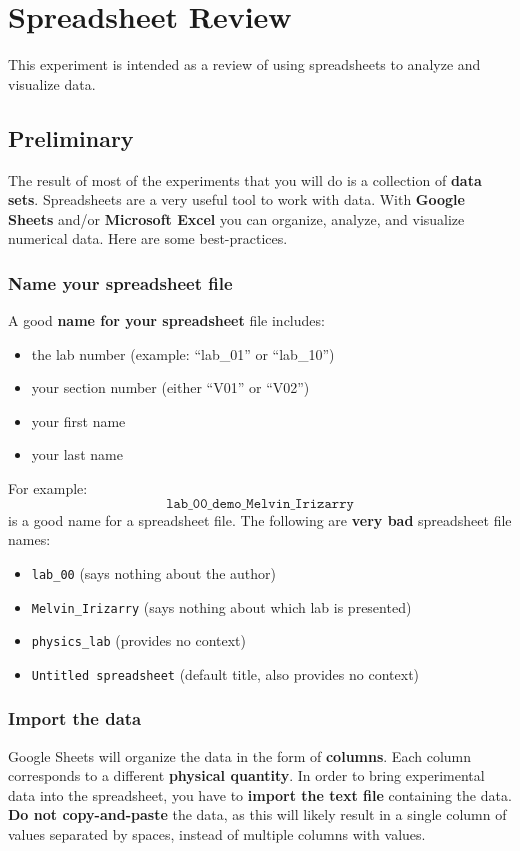 \setcounter{chapter}{-1}
\chapter{Spreadsheet Review}
%
This experiment is intended as a review of using spreadsheets to analyze and visualize data.
%
\section{Preliminary}
%
The result of most of the experiments that you will do is a collection of \textbf{data sets}. Spreadsheets are a very useful tool to work with data. With \textbf{Google Sheets} and/or \textbf{Microsoft Excel} you can organize, analyze, and visualize numerical data. Here are some best-practices.
%
\subsection{Name your spreadsheet file}
%
A good \textbf{name for your spreadsheet} file includes:
\begin{itemize}
    \item the lab number (example: ``lab\_01'' or ``lab\_10'')
    \item your section number (either ``V01'' or ``V02'')
    \item your first name
    \item your last name
\end{itemize}
For example:
\begin{equation}
    \texttt{lab\_00\_demo\_Melvin\_Irizarry}
\end{equation}
is a good name for a spreadsheet file. The following are \textbf{very bad} spreadsheet file names:
\begin{itemize}
    \item \texttt{lab\_00} (says nothing about the author)
    \item \texttt{Melvin\_Irizarry} (says nothing about which lab is presented)
    \item \texttt{physics\_lab} (provides no context)
    \item \texttt{Untitled spreadsheet} (default title, also provides no context)
\end{itemize}
%
\subsection{Import the data}
%
Google Sheets will organize the data in the form of \textbf{columns}. Each column corresponds to a different \textbf{physical quantity}. In order to bring experimental data into the spreadsheet, you have to \textbf{import the text file} containing the data. \textbf{Do not copy-and-paste} the data, as this will likely result in a single column of values separated by spaces, instead of multiple columns with values.


